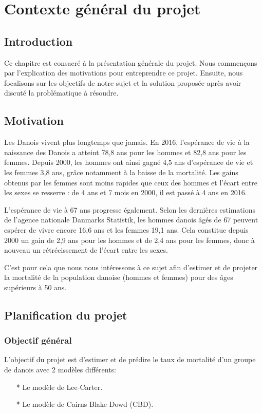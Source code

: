 \chapter{Contexte général du projet}

\section*{Introduction}
Ce chapitre est consacré à la présentation générale du projet. Nous commençons par l'explication des motivations pour entreprendre ce projet. Ensuite, nous focalisons sur les objectifs de notre sujet et la solution proposée après avoir discuté la problématique à résoudre.
\section{Motivation}
Les Danois vivent plus longtemps que jamais. En 2016, l’espérance de vie à la naissance des Danois a atteint 78,8 ans pour les hommes et 82,8 ans pour les femmes. Depuis 2000, les hommes ont ainsi gagné 4,5 ans d’espérance de vie et les femmes 3,8 ans, grâce notamment à la baisse de la mortalité. Les gains obtenus par les femmes sont moins rapides que ceux des hommes et l’écart entre les sexes se resserre : de 4 ans et 7 mois en 2000, il est passé à 4 ans en 2016.

L’espérance de vie à 67 ans progresse également. Selon les dernières estimations de l’agence nationale Danmarks Statistik, les hommes danois âgés de 67 peuvent espérer de vivre encore 16,6 ans et les femmes 19,1 ans. Cela constitue depuis 2000 un gain de 2,9 ans pour les hommes et de 2,4 ans pour les femmes, donc à nouveau un rétrécissement de l’écart entre les sexes.

C'est pour cela que nous nous intéressons à ce sujet afin d'estimer et de projeter la mortalité de la population danoise (hommes et femmes) pour des âges supérieurs à 50 ans.

\section{Planification du projet}
\subsection{Objectif général}
L’objectif du projet est d'estimer et de prédire le taux de mortalité d'un groupe de danois avec 2 modèles différents: 
\begin{itemize}
    \item[*] Le modèle de Lee-Carter.
    \item[*] Le modèle de Cairns Blake Dowd (CBD).
\end{itemize}
